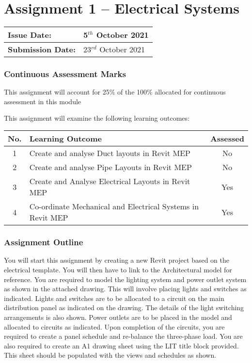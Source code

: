 


	
\part*{Assignment 1 – Electrical Systems}

\begin{tabularx}{\textwidth}{ |X|X| }
	\hline
	\textbf{Issue Date:} & 5$^{th}$ October 2021 \\
	\hline 
	\textbf{Submission Date:}  & 23$^{rd}$ October 2021 \\
	\hline
\end{tabularx}


\section*{Continuous Assessment Marks}
This assignment will account for 25\% of the 100\% allocated for continuous assessment in this module

This assignment will examine the following learning outcomes:\\

\begin{tabularx}{\textwidth}{ |c|X|c| }
	\hline
	\textbf{No.} & \textbf{Learning Outcome} & \textbf{Assessed} \\
	\hline 
	1  & Create and analyse Duct layouts in Revit MEP & No \\
	2  & Create and analyse Pipe Layouts in Revit MEP & No \\
	3  & Create and Analyse Electrical Layouts in Revit MEP & Yes \\
	4  & Co-ordinate Mechanical and Electrical Systems in Revit MEP & Yes \\
	\hline
\end{tabularx}





\section*{Assignment Outline}
You will start this assignment by creating a new Revit project based on the electrical template. You will then have to link to the Architectural model for reference.
You are required to model the lighting system and power outlet system as shown in the attached drawing. This will involve placing lights and switches as indicated. Lights and switches are to be allocated to a circuit on the main distribution panel as indicated on the drawing. The details of the light switching arrangements is also shown.
Power outlets are to be placed in the model and allocated to circuits as indicated.
Upon completion of the circuits, you are required to create a panel schedule and re-balance the three-phase load.
You are also required to create an A1 drawing sheet using the LIT title block provided. This sheet should be populated with the views and schedules as shown.

